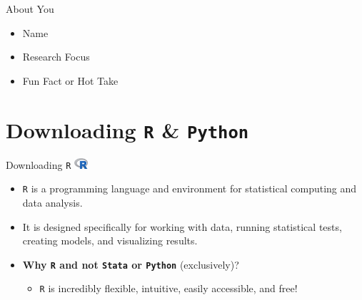 \documentclass[
  ignorenonframetext,
]{beamer}
\providecommand{\tightlist}{%
  \setlength{\itemsep}{0pt}\setlength{\parskip}{0pt}}
\begin{document}
\begin{frame}{About You}
\label{about-you}
\begin{itemize}
\tightlist
\item
  Name

  \par \vspace{2.5mm}
\item
  Research Focus

  \par \vspace{2.5mm}
\item
  Fun Fact or Hot Take

  \par \vspace{2.5mm}
\end{itemize}
\end{frame}

\section{\texorpdfstring{Downloading \texttt{R} \&
\texttt{Python}}{Downloading  \& }}\label{downloading}

\begin{frame}{Downloading \texttt{R} \hspace{1.5mm}
\includegraphics[width=5mm]{../../images/R_logo.png}}
\label{downloading-1}
\begin{itemize}
  
  \item \texttt{R} is a programming language and environment for statistical computing and data analysis. \par \vspace{2.5mm}
  
  \item It is designed specifically for working with data, running statistical tests, creating models, and visualizing results. \par \vspace{2.5mm}
  
  \item \textbf{Why \texttt{R} and not \texttt{Stata} or \texttt{Python}} (exclusively)? \par \vspace{2.5mm}
  
  \begin{itemize}
    \item \texttt{R} is incredibly flexible, intuitive, easily accessible, and free! 
  \end{itemize}
  
  \end{itemize}
\end{frame}
\end{document}
